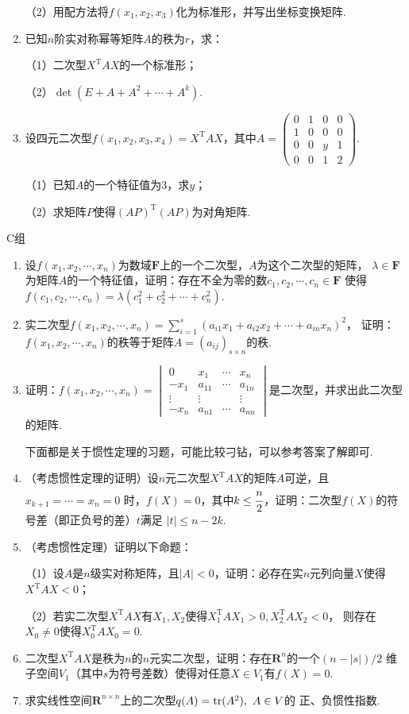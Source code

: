 \begin{enumerate}
	（2）用配方法将$f(x_1,x_2,x_3)$化为标准形，并写出坐标变换矩阵.
	\item 已知$n$阶实对称幂等矩阵$A$的秩为$r$，求：
	
	（1）二次型$X^\mathrm{T}AX$的一个标准形；

	（2）$\det(E+A+A^2+\cdots+A^k)$.
	\item 设四元二次型$f(x_1,x_2,x_3,x_4)=X^\mathrm{T}AX$，其中$A=\begin{pmatrix}
		0 & 1 & 0 & 0 \\ 1 & 0 & 0 & 0 \\ 0 & 0 & y & 1 \\ 0 & 0 & 1 & 2
	\end{pmatrix}$.

	（1）已知$A$的一个特征值为3，求$y$；

	（2）求矩阵$P$使得$(AP)^\mathrm{T}(AP)$为对角矩阵.
\end{enumerate}
\centerline{\heiti C组}

\begin{enumerate}
	\item 设$f(x_1,x_2,\cdots,x_n)$为数域$\mathbf{F}$上的一个二次型，$A$为这个二次型的矩阵，
	$\lambda\in\mathbf{F}$为矩阵$A$的一个特征值，证明：存在不全为零的数$c_1,c_2,\cdots,c_n\in\mathbf{F}$
	使得$f(c_1,c_2,\cdots,c_n)=\lambda(c_1^2+c_2^2+\cdots+c_n^2)$.
	\item 实二次型$f(x_1,x_2,\cdots,x_n)=\sum\limits_{i=1}^{s}(a_{i1}x_1+a_{i2}x_2+\cdots+a_{in}x_n)^2$，
	证明：$f(x_1,x_2,\cdots,x_n)$的秩等于矩阵$A=(a_{ij})_{s\times n}$的秩.
	\item 证明：$f(x_1,x_2,\cdots,x_n)=\begin{vmatrix}
		0 & x_1 & \cdots & x_n \\
		-x_1 & a_{11} & \cdots & a_{1n} \\
		\vdots & \vdots &  & \vdots \\
		-x_n & a_{n1} & \cdots & a_{nn}
	\end{vmatrix}$是二次型，并求出此二次型的矩阵.
	
	下面都是关于惯性定理的习题，可能比较刁钻，可以参考答案了解即可.
	\item （考虑惯性定理的证明）设$n$元二次型$X^\mathrm{T}AX$的矩阵$A$可逆，且$x_{k+1}=\cdots=x_n=0$
	时，$f(X)=0$，其中$k\le\cfrac{n}{2}$，证明：二次型$f(X)$的符号差（即正负号的差）$t$满足
	$|t|\le n-2k$.
	\item （考虑惯性定理）证明以下命题：
	
	（1）设$A$是$n$级实对称矩阵，且$|A|<0$，证明：必存在实$n$元列向量$X$使得$X^\mathrm{T}AX<0$；

	（2）若实二次型$X^\mathrm{T}AX$有$X_1,X_2$使得$X_1^\mathrm{T}AX_1>0,X_2^\mathrm{T}AX_2<0$，
	则存在$X_0\neq 0$使得$X_0^\mathrm{T}AX_0=0$.
	\item 二次型$X^\mathrm{T}AX$是秩为$n$的$n$元实二次型，证明：存在$\mathbf{R}^n$的一个$(n-|s|)/2$
	维子空间$V_1$（其中$s$为符号差数）使得对任意$X\in V_1$有$f(X)=0$.
	\item 求实线性空间$\mathbf{R}^{n\times n}$上的二次型$q(A)=\textup{tr}(A^2),\ A\in V$的
	正、负惯性指数.
\end{enumerate}
